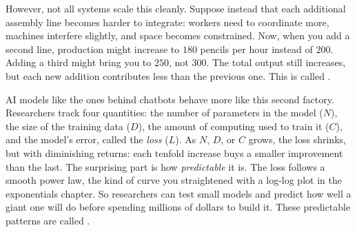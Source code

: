 However, not all systems scale this cleanly. Suppose instead that each additional assembly line becomes harder to integrate: workers need to coordinate more, machines interfere slightly, and space becomes constrained. Now, when you add a second line, production might increase to $180$ pencils per hour instead of $200$. Adding a third might bring you to $250$, not $300$. The total output still increases, but each new addition contributes less than the previous one. This is called .

\begin{figure}
\end{figure}
AI models like the ones behind chatbots
behave more like this second factory. Researchers track four quantities:
the number of parameters in the model ($N$), the size of the training data
($D$), the amount of computing used to train it ($C$), and the model's
error, called the \emph{loss} ($L$). As $N$, $D$, or $C$ grows, the loss
shrinks, but with diminishing returns: each tenfold increase buys a
smaller improvement than the last. The surprising part is how
\emph{predictable} it is. The loss follows a smooth power law, the kind of
curve you straightened with a log-log plot in the exponentials chapter.
So researchers can test small models and predict how well a giant one will
do before spending millions of dollars to build it. These predictable
patterns are called .


